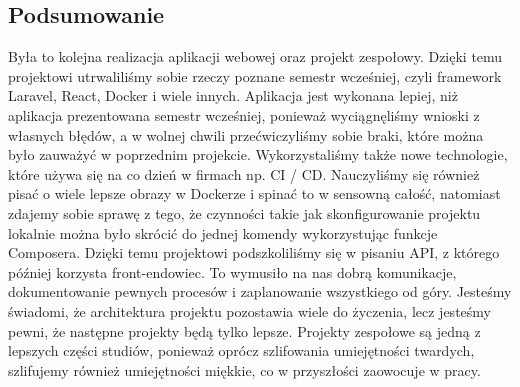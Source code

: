 \documentclass[12pt, letterpaper]{article}
\begin{document}
\subsection{Podsumowanie}
\item{Była to kolejna realizacja aplikacji webowej oraz projekt zespołowy. Dzięki temu projektowi utrwaliliśmy sobie rzeczy poznane semestr wcześniej, czyli framework Laravel, React, Docker i wiele innych. Aplikacja jest wykonana lepiej, niż aplikacja prezentowana semestr wcześniej, ponieważ wyciągnęliśmy wnioski z własnych błędów, a w wolnej chwili przećwiczyliśmy sobie braki, które można było zauważyć w poprzednim projekcie. Wykorzystaliśmy także nowe technologie, które używa się na co dzień w firmach np. CI / CD. Nauczyliśmy się również pisać o wiele lepsze obrazy w Dockerze i spinać to w sensowną całość, natomiast zdajemy sobie sprawę z tego, że czynności takie jak skonfigurowanie projektu lokalnie można było skrócić do jednej komendy wykorzystując funkcje Composera. Dzięki temu projektowi podszkoliliśmy się w pisaniu API, z którego później korzysta front-endowiec. To wymusiło na nas dobrą komunikacje, dokumentowanie pewnych procesów i zaplanowanie wszystkiego od góry. Jesteśmy świadomi, że architektura projektu pozostawia wiele do życzenia, lecz jesteśmy pewni, że następne projekty będą tylko lepsze. Projekty zespołowe są jedną z lepszych części studiów, ponieważ oprócz szlifowania umiejętności twardych, szlifujemy również umiejętności miękkie, co w przyszłości zaowocuje w pracy.
}\pagebreak
\end{document}
